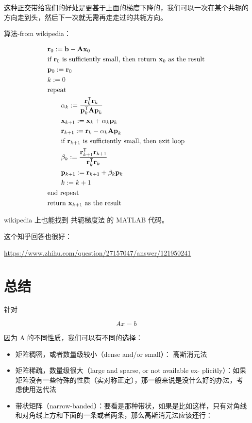 \documentclass[
]{book}
\providecommand{\tightlist}{%
  \setlength{\itemsep}{0pt}\setlength{\parskip}{0pt}}
\begin{document}
这种正交带给我们的好处是更甚于上面的梯度下降的，我们可以一次在某个共轭的方向走到头，然后下一次就无需再走走过的共轭方向。

算法-from wikipedia：

\[
\begin{aligned}
& \mathbf{r}_0 := \mathbf{b} - \mathbf{A x}_0 \\
& \hbox{if } \mathbf{r}_{0} \text{ is sufficiently small, then return } \mathbf{x}_{0} \text{ as the result}\\
& \mathbf{p}_0 := \mathbf{r}_0 \\
& k := 0 \\
& \text{repeat} \\
& \qquad \alpha_k := \frac{\mathbf{r}_k^\mathsf{T} \mathbf{r}_k}{\mathbf{p}_k^\mathsf{T} \mathbf{A p}_k}  \\
& \qquad \mathbf{x}_{k+1} := \mathbf{x}_k + \alpha_k \mathbf{p}_k \\
& \qquad \mathbf{r}_{k+1} := \mathbf{r}_k - \alpha_k \mathbf{A p}_k \\
& \qquad \hbox{if } \mathbf{r}_{k+1} \text{ is sufficiently small, then exit loop} \\
& \qquad \beta_k := \frac{\mathbf{r}_{k+1}^\mathsf{T} \mathbf{r}_{k+1}}{\mathbf{r}_k^\mathsf{T} \mathbf{r}_k} \\
& \qquad \mathbf{p}_{k+1} := \mathbf{r}_{k+1} + \beta_k \mathbf{p}_k \\
& \qquad k := k + 1 \\
& \text{end repeat} \\
& \text{return } \mathbf{x}_{k+1} \text{ as the result}
\end{aligned}
\]

wikipedia 上也能找到 共轭梯度法 的 MATLAB 代码。

这个知乎回答也很好：

\url{https://www.zhihu.com/question/27157047/answer/121950241}

\hypertarget{ux603bux7ed3}{%
\section{总结}\label{ux603bux7ed3}}

针对

\[
Ax = b
\]

因为 A 的不同性质，我们可以有不同的选择：

\begin{itemize}
\tightlist
\item
  矩阵稠密，或者数量级较小（dense and/or small）： 高斯消元法
\item
  矩阵稀疏，数量级很大（large and sparse, or not available ex- plicitly）：如果矩阵没有一些特殊的性质（实对称正定），那一般来说是没什么好的办法，考虑使用迭代法
\item
  带状矩阵（narrow-banded）：要看是那种带状，如果是比如这样，只有对角线和对角线上方和下面的一条或者两条，那么高斯消元法应该还行：
\end{itemize}
\end{document}

